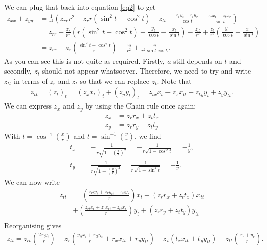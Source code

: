 \documentclass{article}
\begin{document}
We can plug that back into equation \ref{eq2} to get
\begin{align*}
  z_{xx} + z_{yy} &= \frac{1}{r^2}\left(
    z_{rr}r^2+z_r r(\sin^2 t - \cos^2 t) - z_{tt}
    -\frac{z_r y_t -z_t y_r}{\cos t} - \frac{z_r x_t - z_t x_r}{\sin t}
  \right)\\
  &= z_{rr} + \frac{z_r}{r^2}\left(r(\sin^2 t - \cos^2 t) - \frac{y_t}{\cos t} - \frac{x_t}{\sin t}\right)-\frac{z_{tt}}{r^2}
  +\frac{z_t}{r^2}\left(\frac{y_r}{\cos t} + \frac{x_r}{\sin t}\right)\\
  &= z_{rr} + z_r\left(\frac{\sin^2 t - \cos^2 t}{r}\right)-\frac{z_{tt}}{r^2}+\frac{z_t}{r^2\sin t\cos t}.
\end{align*}
As you can see this is not quite as required. Firstly, $a$ still depends on $t$ and secondly, $z_t$ should not appear whatsoever.
Therefore, we need to try and write $z_{tt}$ in terms of $z_r$ and $z_t$ so that we can replace $z_t$. Note that
\begin{align*}
  z_{tt} = (z_t)_t = (z_x x_t)_t + (z_y y_t)_t = z_{tx}x_t + z_x x_{tt} + z_{ty}y_t + z_y y_{tt}.
\end{align*}
We can express $z_x$ and $z_y$ by using the Chain rule once again:
\begin{align*}
  z_x &= z_r r_x + z_t t_x\\
  z_y &= z_r r_y + z_t t_y
\end{align*}
With $t=\cos^{-1}\left(\frac{x}{r}\right)$ and $t=\sin^{-1}\left(\frac{y}{r}\right)$, we find
\begin{align*}
  t_x &= -\frac{1}{r\sqrt{1-\left(\frac{x}{r}\right)^2}}  = - \frac{1}{r\sqrt{1-\cos^2 t}} = -\frac{1}{y},\\
  t_y &= \frac{1}{r\sqrt{1-\left(\frac{y}{r}\right)^2}}  = \frac{1}{r\sqrt{1-\sin^2 t}} = -\frac{1}{y}.
\end{align*}
We can now write
\begin{align*}
  z_{tt} &=
  \left(\frac{z_{rt}y_t + z_ry_{tt} - z_{tt}y_{r}}{r}\right)x_t + (z_r r_x + z_t t_x)x_{tt}\\
  &+\left(\frac{z_{rt}x_t + z_r x_{tt} - z_{tt}x_r}{r}\right)y_t + (z_r r_y + z_t t_y)y_{tt}\\
\end{align*}
Reorganising gives
\begin{align}
  \label{eqztt}
  z_{tt} =z_{rt}\left(\frac{2 x_t y_t}{r}\right)+z_r\left(\frac{y_{tt}x_t+x_{tt}y_t}{r}+r_x x_{tt}+r_y y_{tt}\right)
  +z_t(t_x x_{tt} + t_y y_{tt})-z_{tt}\left(\frac{x_r+y_r}{r}\right).
\end{align}
\end{document}
